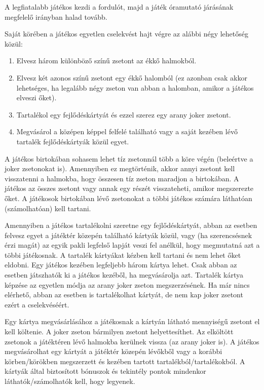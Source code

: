 A legfiatalabb játékos kezdi a fordulót, majd a játék óramutató járásának megfelelő irányban halad tovább.

Saját körében a játékos egyetlen cselekvést hajt végre az alábbi négy lehetőség közül:
\begin{enumerate}
	\item Elvesz három különböző színű zsetont az ékkő halmokból.
	\item Elvesz két azonos színű zsetont egy ékkő halomból (ez
	azonban csak akkor lehetséges, ha legalább négy zseton van
	abban a halomban, amikor a játékos elveszi őket).
	\item Tartalékol egy fejlődéskártyát és ezzel szerez egy arany joker zsetont.
	\item Megvásárol a középen képpel felfelé található vagy a
	saját kezében lévő tartalék fejlődéskártyák közül egyet.
\end{enumerate}


A játékos birtokában sohasem lehet tíz zsetonnál több a köre végén (beleértve a joker zsetonokat is). Amennyiben ez megtörténik, akkor annyi zsetont kell visszatenni a halmokba, hogy összesen tíz zseton maradjon a birtokában. A játékos az összes zsetont vagy annak egy részét visszateheti, amikor megszerezte őket. A játékosok birtokában lévő zsetonokat a többi játékos számára láthatóan (számolhatóan) kell tartani. 


Amennyiben a játékos tartalékolni szeretne egy fejlődéskártyát, abban az esetben felvesz egyet a játéktér közepén található kártyák közül, vagy (ha szerencsésnek érzi magát) az egyik pakli legfelső lapját veszi fel anélkül, hogy megmutatná azt a többi játékosnak. A tartalék kártyákat kézben kell tartani és nem lehet őket eldobni. Egy játékos kezében legfeljebb három kártya lehet. Csak abban az esetben játszhatók ki a játékos kezéből, ha megvásárolja azt. Tartalék kártya képzése az egyetlen módja az arany joker zseton megszerzésének. Ha már nincs elérhető, abban az esetben is tartalékolhat kártyát, de nem kap joker zsetont ezért a cselekvéséért.


Egy kártya megvásárlásához a játékosnak a kártyán látható mennyiségű zsetont el kell költenie. A joker zseton bármilyen zsetont helyettesíthet. Az elköltött zsetonok a játéktéren lévő halmokba kerülnek vissza (az arany joker is). A játékos megvásárolhat egy kártyát a játéktér közepén lévőkből vagy a korábbi körben/körökben megszerzett és kezében tartott tartalékból/tartalékokból. A kártyák által biztosított bónuszok és tekintély pontok mindenkor láthatók/számolhatók kell, hogy legyenek.

